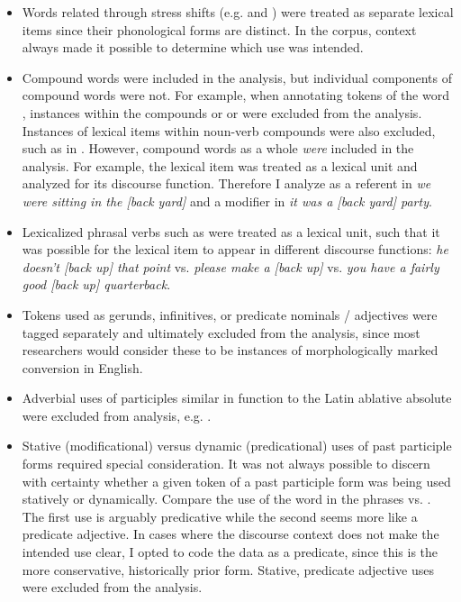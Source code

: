 \begin{itemize}

  \singlespacing

  \item Words related through stress shifts (e.g.  and ) were treated as separate lexical items since their phonological forms are distinct. In the corpus, context always made it possible to determine which use was intended.

  \item Compound words were included in the analysis, but individual components of compound words were not. For example, when annotating tokens of the word , instances within the compounds  or  or  were excluded from the analysis. Instances of lexical items within noun-verb compounds  were also excluded, such as  in . However, compound words as a whole \emph{were} included in the analysis. For example, the lexical item  was treated as a lexical unit and analyzed for its discourse function. Therefore I analyze  as a referent in \textit{we were sitting in the [back yard]} and a modifier in \textit{it was a [back yard] party}.

  \item Lexicalized phrasal verbs such as  were treated as a lexical unit, such that it was possible for the lexical item to appear in different discourse functions: \textit{he doesn't [back up] that point} vs. \textit{please make a [back up]} vs. \textit{you have a fairly good [back up] quarterback}.

  \item Tokens used as gerunds, infinitives, or predicate nominals / adjectives were tagged separately and ultimately excluded from the analysis, since most researchers would consider these to be instances of morphologically marked conversion in English.

  \item Adverbial uses of participles similar in function to the Latin ablative absolute were excluded from analysis, e.g. .

  \item Stative (modificational) versus dynamic (predicational) uses of past participle forms required special consideration. It was not always possible to discern with certainty whether a given token of a past participle form was being used statively or dynamically. Compare the use of the word  in the phrases  vs. . The first use is arguably predicative while the second seems more like a predicate adjective. In cases where the discourse context does not make the intended use clear, I opted to code the data as a predicate, since this is the more conservative, historically prior form. Stative, predicate adjective uses were excluded from the analysis.

\end{itemize}

